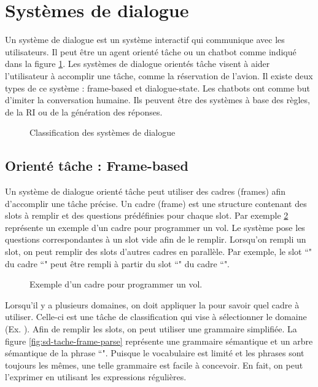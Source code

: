 \documentclass{KodeBook}
\begin{document}
\section{Systèmes de dialogue}

Un système de dialogue est un système interactif qui communique avec les utilisateurs. 
Il peut être un agent orienté tâche ou un chatbot comme indiqué dans la figure \ref{fig:sd-classif}. 
Les systèmes de dialogue orientés tâche visent à aider l'utilisateur à accomplir une tâche, comme la réservation de l'avion. 
Il existe deux types de ce système : frame-based et dialogue-state. 
Les chatbots ont comme but d'imiter la conversation humaine.
Ils peuvent être des systèmes à base des règles, de la RI ou de la génération des réponses.

\begin{figure}[!ht]
	\centering
	\caption{Classification des systèmes de dialogue}
	\label{fig:sd-classif}
\end{figure}


\subsection{Orienté tâche : Frame-based}

Un système de dialogue orienté tâche peut utiliser des cadres (frames) afin d'accomplir une tâche précise. 
Un cadre (frame) est une structure contenant des slots à remplir et des questions prédéfinies pour chaque slot.
Par exemple \ref{fig:sd-tache-frame-exp} représente un exemple d'un cadre pour programmer un vol.
Le système pose les questions correspondantes à un slot vide afin de le remplir.
Lorsqu’on rempli un slot, on peut remplir des slots d'autres cadres en parallèle. 
Par exemple, le slot ``" du cadre ``" peut être rempli à partir du slot ``" du cadre ``".

\begin{figure}[!ht]
	\centering
	\caption{Exemple d'un cadre pour programmer un vol. \cite{2020-jurafsky-martin}}
	\label{fig:sd-tache-frame-exp}
\end{figure}

Lorsqu'il y a plusieurs domaines, on doit appliquer la  pour savoir quel cadre à utiliser. 
Celle-ci est une tâche de classification qui vise à sélectionner le domaine (Ex. ).
Afin de remplir les slots, on peut utiliser une grammaire simplifiée. 
La figure \ref{fig:sd-tache-frame-parse} représente une grammaire sémantique et un arbre sémantique de la phrase ``".
Puisque le vocabulaire est limité et les phrases sont toujours les mêmes, une telle grammaire est facile à concevoir. 
En fait, on peut l'exprimer en utilisant les expressions régulières.
\end{document}

